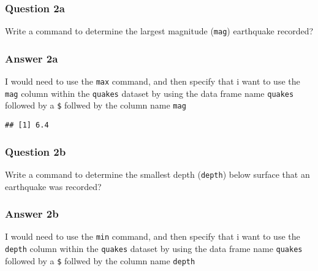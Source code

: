 \documentclass[
]{article}
\newenvironment{Shaded}{\begin{snugshade}}{\end{snugshade}}
\newcommand{\KeywordTok}[1]{\textcolor[rgb]{0.13,0.29,0.53}{\textbf{#1}}}
\newcommand{\NormalTok}[1]{#1}
\newcommand{\OperatorTok}[1]{\textcolor[rgb]{0.81,0.36,0.00}{\textbf{#1}}}
\begin{document}
\hypertarget{question-2a}{%
\subsubsection{Question 2a}\label{question-2a}}

Write a command to determine the largest magnitude (\texttt{mag})
earthquake recorded?

\hypertarget{answer-2a}{%
\subsubsection{Answer 2a}\label{answer-2a}}

I would need to use the \texttt{max} command, and then specify that i
want to use the \texttt{mag} column within the \texttt{quakes} dataset
by using the data frame name \texttt{quakes} followed by a \texttt{\$}
follwed by the column name \texttt{mag}

\begin{Shaded}
\end{Shaded}

\begin{verbatim}
## [1] 6.4
\end{verbatim}

\hypertarget{question-2b}{%
\subsubsection{Question 2b}\label{question-2b}}

Write a command to determine the smallest depth (\texttt{depth}) below
surface that an earthquake was recorded?

\hypertarget{answer-2b}{%
\subsubsection{Answer 2b}\label{answer-2b}}

I would need to use the \texttt{min} command, and then specify that i
want to use the \texttt{depth} column within the \texttt{quakes} dataset
by using the data frame name \texttt{quakes} followed by a \texttt{\$}
follwed by the column name \texttt{depth}

\begin{Shaded}
\end{Shaded}
\end{document}
